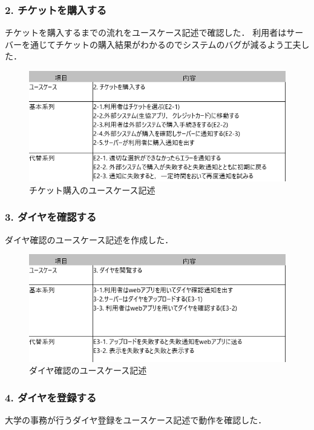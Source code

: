 \documentclass[documentclass]{jsarticle}
\begin{document}
\subsubsection*{2. チケットを購入する}
チケットを購入するまでの流れをユースケース記述で確認した．
利用者はサーバーを通じてチケットの購入結果がわかるのでシステムのバグが減るよう工夫した．

\begin{figure}[H]
  \begin{center}
    \includegraphics*[scale=0.6]{figure/4-2.png}
  \end{center}
  \caption{チケット購入のユースケース記述}
  \label{fig:4-2}
\end{figure}

\subsubsection*{3. ダイヤを確認する}
ダイヤ確認のユースケース記述を作成した．

\begin{figure}[H]
  \begin{center}
    \includegraphics*[scale=0.6]{figure/4-3.png}
  \end{center}
  \caption{ダイヤ確認のユースケース記述}
  \label{fig:4-3}
\end{figure}

\subsubsection*{4. ダイヤを登録する}
大学の事務が行うダイヤ登録をユースケース記述で動作を確認した．
\end{document}
